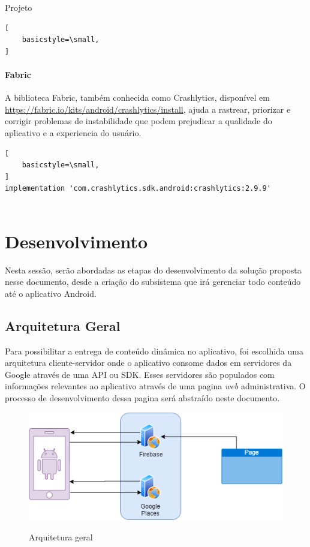\documentclass[
	12pt,				%
	openright,			%
	twoside,			%
	a4paper,			%
	english,			%
	french,				%
	spanish,			%
	brazil				%
	]{abntex2}
\begin{document}
\begin{chapter}{Projeto}
\begin{lstlisting}[
    basicstyle=\small,
]
\end{lstlisting}
   \paragraph{Fabric}
   A biblioteca Fabric, também conhecida como Crashlytics, disponível em \url{https://fabric.io/kits/android/crashlytics/install}, ajuda a rastrear, priorizar e corrigir problemas de instabilidade que podem prejudicar a qualidade do aplicativo e a experiencia do usuário.
   \begin{lstlisting}[
    basicstyle=\small,
]
implementation 'com.crashlytics.sdk.android:crashlytics:2.9.9'
   
\end{lstlisting}

\newpage

\section{Desenvolvimento}
Nesta sessão, serão abordadas as etapas do desenvolvimento da solução proposta nesse documento, desde a criação do subsistema que irá gerenciar todo conteúdo até o aplicativo Android. 

\subsection{Arquitetura Geral}
Para possibilitar a entrega de conteúdo dinâmica no aplicativo, foi escolhida uma arquitetura cliente-servidor onde o aplicativo consome dados em servidores da Google através de uma API ou SDK. Esses servidores são populados com informações relevantes ao aplicativo através de uma pagina \textit{web} administrativa. O processo de desenvolvimento dessa pagina será abstraído neste documento.\\


\begin{figure}[h]
\centering
   \caption{Arquitetura geral}
   \includegraphics[scale=0.85]{media/arquitetura_app.png}
     \label{fig:arquitetura_geral}
\end{figure}


\end{chapter}
\end{document}
